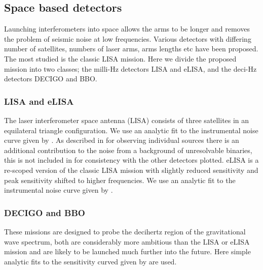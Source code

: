 \subsection{Space based detectors}
Launching interferometers into space allows the arms to be longer and removes the problem of seismic noise at low frequencies. Various detectors with differing number of satellites, numbers of laser arms, arms lengths etc have been proposed. The most studied is the classic LISA mission. Here we divide the proposed mission into two classes; the milli-Hz detectors LISA and eLISA, and the deci-Hz detectors DECIGO and BBO.
\subsubsection{LISA and eLISA}
The laser interferometer space antenna (LISA) consists of three satellites in an equilateral triangle configuration. We use an analytic fit to the instrumental noise curve given by \cite{Sathyaprakash}. As described in \cite{Sathyaprakash} for observing individual sources there is an additional contribution to the noise from a background of unresolvable binaries, this is not included in for consistency with the other detectors plotted. eLISA is a re-scoped version of the classic LISA mission with slightly reduced sensitivity and peak sensitivity shifted to higher frequencies. We use an analytic fit to the instrumental noise curve given by \cite{DoingScienceWitheLISA}.
\subsubsection{DECIGO and BBO}
These missions are designed to probe the decihertz region of the gravitational wave spectrum, both are considerably more ambitious than the LISA or eLISA mission and are likely to be launched much further into the future. Here simple analytic fits to the sensitivity curved given by \cite{2011PhRvD..83d4011Y} are used.





